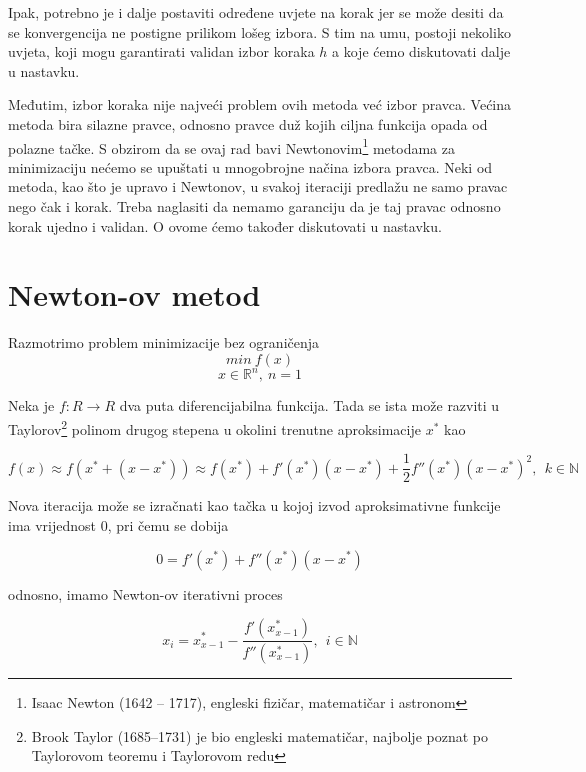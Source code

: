 \documentclass[bosnian,12pt,a4paper]{report}
\begin{document}
	
	
	\justify
	Ipak, potrebno je i dalje postaviti određene uvjete na korak jer se može desiti da se konvergencija ne postigne prilikom lošeg izbora. S tim na umu, postoji nekoliko uvjeta, koji mogu garantirati validan izbor koraka $h$ a koje ćemo diskutovati dalje u nastavku. 
	
	
	\justify
	Međutim, izbor koraka nije najveći problem ovih metoda već izbor pravca. Većina metoda bira silazne pravce, odnosno pravce duž kojih ciljna funkcija opada od polazne tačke. S obzirom da se ovaj rad bavi Newtonovim\footnote{Isaac Newton (1642 – 1717), engleski fizičar, matematičar i astronom} metodama za minimizaciju nećemo se upuštati u mnogobrojne načina izbora pravca. Neki od metoda, kao što je upravo i Newtonov, u svakoj iteraciji predlažu ne samo pravac nego čak i korak. Treba naglasiti da nemamo garanciju da je taj pravac odnosno korak ujedno i validan. O ovome ćemo također diskutovati u nastavku.
	
	\section{Newton-ov metod}
	Razmotrimo problem minimizacije bez ograničenja
	\\
	$$min~f(x)$$
	$$x \in \mathbb{R}^n, ~n=1$$
	
	Neka je $f : R \rightarrow R$ dva puta diferencijabilna funkcija. Tada
	se ista može razviti u Taylorov\footnote{Brook Taylor (1685–1731) je bio engleski matematičar, najbolje poznat po Taylorovom teoremu i Taylorovom redu} polinom drugog stepena u okolini trenutne aproksimacije $x^*$ kao
	
	\vspace{0.25cm}
	$$f(x) \approx f(x^* + (x - x^*)) \approx f(x^*) + f'(x^*)(x-x^*) + \frac{1}{2}f''(x^*)(x-x^*)^2, ~~ k \in \mathbb{N}$$
	
	\vspace{0.5cm}
	Nova iteracija može se izračnati kao tačka u kojoj izvod aproksimativne funkcije ima vrijednost 0, pri čemu se dobija
	\vspace{0.5cm}
	
	$$0 = f'(x^*) + f''(x^*)(x-x^*)$$
	
	\vspace{0.5cm}
	odnosno, imamo Newton-ov iterativni proces
	\vspace{0.5cm}
	
	$$x_{i} = x^*_{x-1} - \frac{f'(x^*_{x-1})}{f''(x^*_{x-1})}, ~~ i \in \mathbb{N}$$
	
\end{document}

